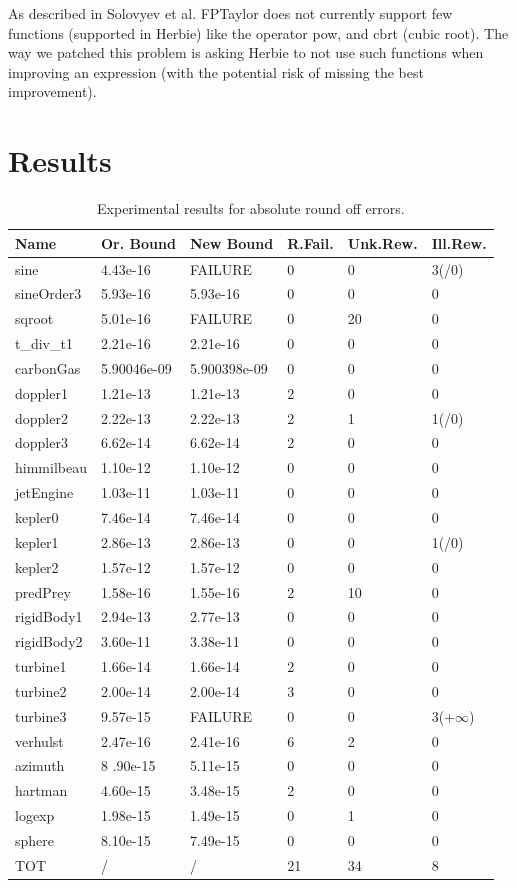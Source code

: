 \documentclass[runningheads]{llncs}
\begin{document}
As described in Solovyev et al. FPTaylor does not currently support few functions (supported in Herbie) like the operator pow, and cbrt (cubic root). The way we patched this problem is asking Herbie to not use such functions when improving an expression (with the potential risk of missing the best improvement).

\section{Results}
\begin{table}
	\centering
	\caption{Experimental results for absolute round off errors.}\label{tab1}
	\begin{tabular}{|l|l|l|l|l|l|}
		\hline
		Name &  Or. Bound & New Bound & R.Fail. & Unk.Rew. &Ill.Rew.\\
		\hline
		sine & 4.43e-16& FAILURE& 0& 0& 3(/0)\\
		sineOrder3 & 5.93e-16& 5.93e-16& 0& 0& 0\\
		sqroot & 5.01e-16& FAILURE& 0& 20& 0\\
		t\_div\_t1 & 2.21e-16 & 2.21e-16 & 0& 0& 0\\
		carbonGas & 5.90046e-09 & 5.900398e-09& 0& 0& 0\\
		doppler1 & 1.21e-13 & 1.21e-13& 2& 0& 0\\
		doppler2 & 2.22e-13 & 2.22e-13 & 2& 1& 1(/0)\\
		doppler3 & 6.62e-14 & 6.62e-14 & 2& 0& 0\\
		himmilbeau & 1.10e-12 & 1.10e-12 & 0& 0& 0\\
		jetEngine & 1.03e-11 & 1.03e-11 & 0& 0& 0\\
		kepler0 & 7.46e-14 & 7.46e-14 & 0& 0& 0\\
		kepler1 & 2.86e-13 & 2.86e-13 & 0& 0& 1(/0)\\
		kepler2 & 1.57e-12 & 1.57e-12 & 0& 0& 0\\
		predPrey & 1.58e-16 & 1.55e-16 & 2& 10& 0\\
		rigidBody1 & 2.94e-13 & 2.77e-13 & 0& 0& 0\\
		rigidBody2 & 3.60e-11 & 3.38e-11 & 0& 0& 0\\
		turbine1 & 1.66e-14 & 1.66e-14 & 2& 0& 0\\
		turbine2 & 2.00e-14 & 2.00e-14 & 3& 0& 0\\
		turbine3 & 9.57e-15& FAILURE& 0& 0& 3(+$\infty$)\\
		verhulst & 2.47e-16 & 2.41e-16 & 6& 2& 0\\
		azimuth & 8 .90e-15 & 5.11e-15 & 0& 0& 0\\
		hartman & 4.60e-15 & 3.48e-15& 2& 0& 0\\
		logexp & 1.98e-15& 1.49e-15& 0& 1& 0\\
		sphere & 8.10e-15& 7.49e-15& 0& 0& 0\\
		TOT & / & / & 21 & 34 &8\\		
		\hline
	\end{tabular}
\end{table}
\end{document}
